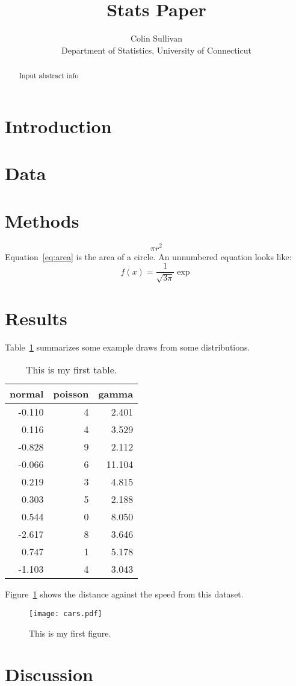 \documentclass[12pt]{article}
\title{Stats Paper}
\author{Colin Sullivan\\
Department of Statistics, University of Connecticut}
\begin{document}
\maketitle

\begin{abstract}
Input abstract info 	
\end{abstract}

\section{Introduction}
\label{sec:intro}


\section{Data}
\label{sec:data}

\section{Methods}
\label{sec:meth}
\begin{equation}
	\label{eq:area}
	\pi r^2
\end{equation}
Equation~\eqref{eq:area} is the area of a circle.
An unnumbered equation looks like:
\[
f(x)=\frac{1}{\sqrt{3\pi}}\exp
\]

\section{Results}
\label{sec:results}
Table~\ref{tab:rv} summarizes some example draws from some distributions.


\begin{table}[ht]
  \caption{This is my first table.}
  \label{tab:rv}
\centering
\begin{tabular}{rrr}
  \hline
normal & poisson & gamma \\ 
  \hline
-0.110 & 4 & 2.401 \\ 
  0.116 & 4 & 3.529 \\ 
  -0.828 & 9 & 2.112 \\ 
  -0.066 & 6 & 11.104 \\ 
  0.219 & 3 & 4.815 \\ 
  0.303 & 5 & 2.188 \\ 
  0.544 & 0 & 8.050 \\ 
  -2.617 & 8 & 3.646 \\ 
  0.747 & 1 & 5.178 \\ 
  -1.103 & 4 & 3.043 \\ 
   \hline
\end{tabular}
\end{table}

Figure~\ref{fig:cars} shows the distance against the speed from this dataset.

\begin{figure}
  \centering
  \texttt{[image: cars.pdf]}
  \caption{This is my first figure.}
  \label{fig:cars}
\end{figure}

\section{Discussion}
\label{sec:disc}
\end{document}
